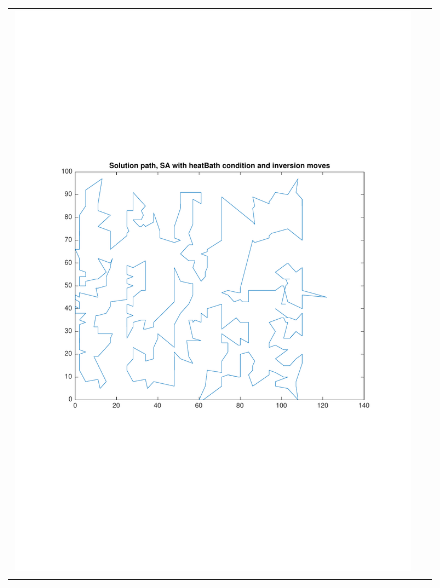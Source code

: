 \documentclass[a4paper, 11pt]{scrartcl}
\begin{document}
\begin{figure}[!ht]
\begin{tabular}{cc}
    \includegraphics[scale=0.4, trim={3cm 6cm 1cm 6cm}]{../figures/solutionPath_SA_heatBath_inversion.pdf} & 

\end{tabular}
\end{figure}
\end{document}
